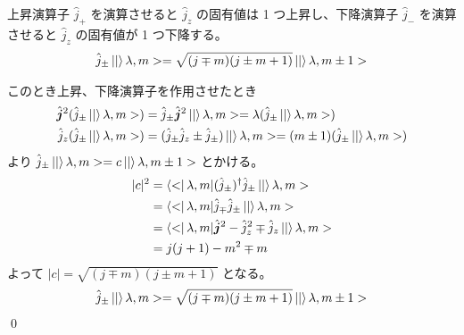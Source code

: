 \documentclass[uplatex,dvipdfmx,a4paper,11pt]{jlreq}
\makeatletter
\numberwithin{equation}{section}
\theoremstyle{definition}
\renewenvironment{proof}[1][\proofname]{\par
  \normalfont
  \topsep6\p@\@plus6\p@ \trivlist
  \item[\hskip\labelsep{\bfseries #1}\@addpunct{\bfseries}]\ignorespaces\quad\par
}{%
  \qed\endtrivlist\@endpefalse
}
\renewcommand\proofname{証明}
\makeatother
\begin{document}
\begin{proposition}
  上昇演算子 $\hat{j}_+$ を演算させると $\hat{j}_z$ の固有値は 1 つ上昇し、下降演算子 $\hat{j}_-$ を演算させると $\hat{j}_z$ の固有値が 1 つ下降する。
  \begin{align}
    \hat{j}_\pm\ket|\lambda, m> = \sqrt{(j \mp m)(j \pm m + 1)}\ket|\lambda, m\pm 1>
  \end{align}
\end{proposition}
\begin{proof}
  このとき上昇、下降演算子を作用させたとき
  \begin{align}
    \hat{\bm{j}}^2(\hat{j}_\pm\ket|\lambda, m>) & = \hat{j}_\pm\hat{\bm{j}}^2\ket|\lambda, m> = \lambda (\hat{j}_\pm\ket|\lambda, m>)               \\
    \hat{j}_z(\hat{j}_\pm\ket|\lambda, m>)      & = (\hat{j}_\pm \hat{j}_z \pm \hat{j}_\pm)\ket|\lambda, m> = (m\pm 1)(\hat{j}_\pm\ket|\lambda, m>)
  \end{align}
  より $\hat{j}_\pm\ket|\lambda, m> = c\ket|\lambda, m\pm 1>$ とかける。
  \begin{align}
    |c|^2 & = \bra<\lambda, m|(\hat{j}_\pm)^\dagger\hat{j}_\pm\ket|\lambda, m>           \\
          & = \bra<\lambda, m|\hat{j}_\mp\hat{j}_\pm\ket|\lambda, m>                     \\
          & = \bra<\lambda, m|\hat{\bm{j}}^2 - \hat{j}_z^2 \mp \hat{j}_z\ket|\lambda, m> \\
          & = j(j+1) - m^2 \mp m
  \end{align}
  よって $|c| = \sqrt{(j \mp m)(j \pm m + 1)}$ となる。
  \begin{align}
    \hat{j}_\pm\ket|\lambda, m> = \sqrt{(j \mp m)(j \pm m + 1)}\ket|\lambda, m\pm 1>
  \end{align}
\end{proof}
\end{document}
